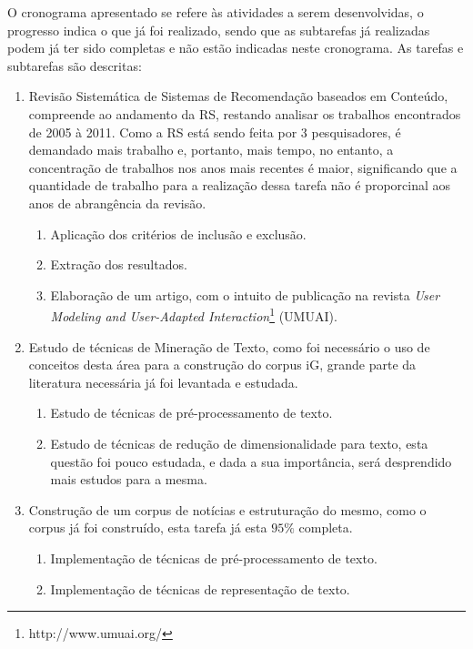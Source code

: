 \documentclass[normaltoc, espacoumemeio, pnumromarab,ruledheader]{abnt}
\begin{document}
O cronograma apresentado se refere às atividades a serem desenvolvidas, o progresso indica o que já foi realizado, sendo que as subtarefas já realizadas podem já ter sido completas e não estão indicadas neste cronograma. As tarefas e subtarefas são descritas:
\begin{enumerate}
  \item[{\texttt{[1]}}] Revisão Sistemática de Sistemas de Recomendação baseados em Conteúdo, compreende ao andamento da RS, restando analisar os trabalhos encontrados de 2005 à 2011. Como a RS está sendo feita por 3 pesquisadores, é demandado mais trabalho e, portanto, mais tempo, no entanto, a concentração de trabalhos nos anos mais recentes é maior, significando que a quantidade de trabalho para a realização dessa tarefa não é proporcinal aos anos de abrangência da revisão.
  \begin{enumerate}
    \item[{\texttt{[1.1]}}] Aplicação dos critérios de inclusão e exclusão.
    \item[{\texttt{[1.2]}}] Extração dos resultados.
    \item[{\texttt{[1.3]}}] Elaboração de um artigo, com o intuito de publicação na revista \textit{User Modeling and User-Adapted Interaction}\footnote{http://www.umuai.org/} (UMUAI).
  \end{enumerate}
  \item[{\texttt{[2]}}] Estudo de técnicas de Mineração de Texto, como foi necessário o uso de conceitos desta área para a construção do corpus iG, grande parte da literatura necessária já foi levantada e estudada.
  \begin{enumerate}
    \item[{\texttt{[2.1]}}] Estudo de técnicas de pré-processamento de texto.
    \item[{\texttt{[2.2]}}] Estudo de técnicas de redução de dimensionalidade para texto, esta questão foi pouco estudada, e dada a sua importância, será desprendido mais estudos para a mesma.
  \end{enumerate}
  \item[{\texttt{[4]}}] Construção de um corpus de notícias e estruturação do mesmo, como o corpus já foi construído, esta tarefa já esta $95\%$ completa.
  \begin{enumerate}
    \item[{\texttt{[3.1]}}] Implementação de técnicas de pré-processamento de texto.
    \item[{\texttt{[3.2]}}] Implementação de técnicas de representação de texto.

\end{enumerate}
\end{enumerate}
\end{document}
